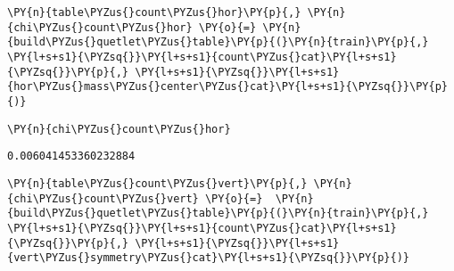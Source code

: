     \begin{tcolorbox}[breakable, size=fbox, boxrule=1pt, pad at break*=1mm,colback=cellbackground, colframe=cellborder]
\begin{Verbatim}[commandchars=\\\{\}]
\PY{n}{table\PYZus{}count\PYZus{}hor}\PY{p}{,} \PY{n}{chi\PYZus{}count\PYZus{}hor} \PY{o}{=} \PY{n}{build\PYZus{}quetlet\PYZus{}table}\PY{p}{(}\PY{n}{train}\PY{p}{,} \PY{l+s+s1}{\PYZsq{}}\PY{l+s+s1}{count\PYZus{}cat}\PY{l+s+s1}{\PYZsq{}}\PY{p}{,} \PY{l+s+s1}{\PYZsq{}}\PY{l+s+s1}{hor\PYZus{}mass\PYZus{}center\PYZus{}cat}\PY{l+s+s1}{\PYZsq{}}\PY{p}{)}
\end{Verbatim}
\end{tcolorbox}

    \begin{tcolorbox}[breakable, size=fbox, boxrule=1pt, pad at break*=1mm,colback=cellbackground, colframe=cellborder]
\begin{Verbatim}[commandchars=\\\{\}]
\PY{n}{chi\PYZus{}count\PYZus{}hor}
\end{Verbatim}
\end{tcolorbox}

            \begin{tcolorbox}[breakable, size=fbox, boxrule=.5pt, pad at break*=1mm, opacityfill=0]
\begin{Verbatim}[commandchars=\\\{\}]
0.006041453360232884
\end{Verbatim}
\end{tcolorbox}
        
    \begin{tcolorbox}[breakable, size=fbox, boxrule=1pt, pad at break*=1mm,colback=cellbackground, colframe=cellborder]
\begin{Verbatim}[commandchars=\\\{\}]
\PY{n}{table\PYZus{}count\PYZus{}vert}\PY{p}{,} \PY{n}{chi\PYZus{}count\PYZus{}vert} \PY{o}{=}  \PY{n}{build\PYZus{}quetlet\PYZus{}table}\PY{p}{(}\PY{n}{train}\PY{p}{,} \PY{l+s+s1}{\PYZsq{}}\PY{l+s+s1}{count\PYZus{}cat}\PY{l+s+s1}{\PYZsq{}}\PY{p}{,} \PY{l+s+s1}{\PYZsq{}}\PY{l+s+s1}{vert\PYZus{}symmetry\PYZus{}cat}\PY{l+s+s1}{\PYZsq{}}\PY{p}{)}
\end{Verbatim}
\end{tcolorbox}

